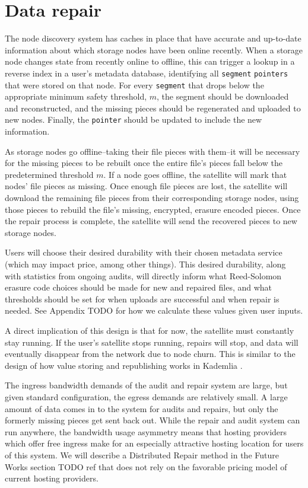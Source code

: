 \documentclass[11pt,fleqn,openany]{book}
\newcommand{\x}[1]{{\tt #1}} \newcommand{\code}[1]{{\em #1}}
\newcommand{\todo}[1]{{\color{red} TODO #1 }}
\begin{document}
\section{Data repair}\label{sec:concrete-data-repair}

The node discovery system has caches in place that have accurate and
up-to-date information about which storage nodes have been online recently.
When a storage node changes state from recently online to offline, this can
trigger a lookup in a reverse index in a user's metadata database, identifying
all \x{segment} \x{pointers} that were stored on that node.
For every \x{segment} that drops below the appropriate minimum safety
threshold, $m$, the segment should be downloaded and reconstructed, and the
missing pieces should be regenerated and uploaded to new nodes. Finally, the
\x{pointer} should be updated to include the new information.

As storage nodes go offline--taking their file pieces with them--it will
be necessary for the missing pieces to be rebuilt once the entire file's pieces
fall below the predetermined threshold $m$. If a node goes offline, the
satellite will mark that nodes' file pieces as missing.
Once enough file pieces are lost, the satellite will download the
remaining file pieces from their corresponding storage nodes, using those
pieces
to rebuild the file's missing, encrypted, erasure encoded pieces.
Once the repair process is complete, the satellite will send the
recovered pieces to new storage nodes.

Users will choose their desired durability with their chosen metadata service
(which may impact price, among other things). This desired durability, along
with
statistics from ongoing audits, will directly inform what Reed-Solomon erasure
code choices should be made for new and repaired files, and what thresholds
should be set for when uploads are successful and when repair is needed. See
Appendix \todo{} for how we calculate these values given user inputs.

A direct implication of this design is that for now, the satellite must
constantly stay running. If the user's satellite stops running, repairs will
stop, and data will eventually disappear from the network due to node churn.
This is similar to the design of how value storing and republishing works in
Kademlia \cite{kad}.

The ingress bandwidth demands of the audit and repair system are large, but
given standard configuration, the egress demands are relatively small.
A large amount of data comes in to the system for audits and repairs, but only
the formerly missing pieces get sent back out.
While the repair and audit system can run anywhere, the bandwidth usage
asymmetry means that hosting providers which offer free ingress
make for an especially attractive hosting location for users of this system.
We will describe a Distributed Repair method in the Future Works section
\todo{ref} that
does not rely on the favorable pricing model of current hosting providers.
\end{document}
